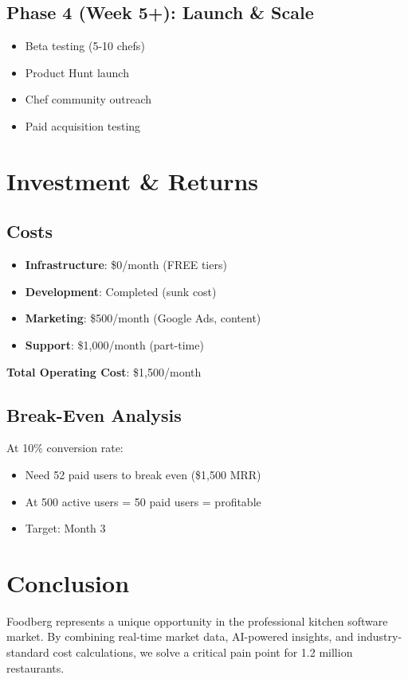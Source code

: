 \documentclass[11pt,a4paper]{article}
\begin{document}
\subsection{Phase 4 (Week 5+): Launch \& Scale}
\begin{itemize}
    \item Beta testing (5-10 chefs)
    \item Product Hunt launch
    \item Chef community outreach
    \item Paid acquisition testing
\end{itemize}

\section{Investment \& Returns}

\subsection{Costs}
\begin{itemize}
    \item \textbf{Infrastructure}: \$0/month (FREE tiers)
    \item \textbf{Development}: Completed (sunk cost)
    \item \textbf{Marketing}: \$500/month (Google Ads, content)
    \item \textbf{Support}: \$1,000/month (part-time)
\end{itemize}

\textbf{Total Operating Cost}: \$1,500/month

\subsection{Break-Even Analysis}
At 10\% conversion rate:
\begin{itemize}
    \item Need 52 paid users to break even (\$1,500 MRR)
    \item At 500 active users = 50 paid users = profitable
    \item Target: Month 3
\end{itemize}

\section{Conclusion}

Foodberg represents a unique opportunity in the professional kitchen software market. By combining real-time market data, AI-powered insights, and industry-standard cost calculations, we solve a critical pain point for 1.2 million restaurants.
\end{document}
